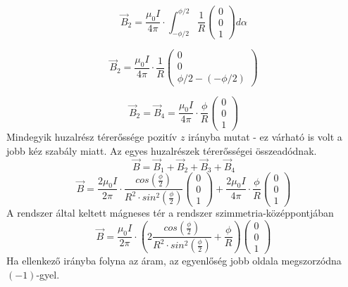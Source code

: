 \documentclass[11pt,a4paper,openany,leqno]{article}
\begin{document}
$$ \vec{B}_2 = \frac{\mu_0 I}{4\pi} \cdot \int_{-\phi/2}^{\phi/2} \frac{1}{R}\begin{pmatrix} 0 \\ 0 \\ 1 \end{pmatrix} d\alpha $$

$$ \vec{B}_2 = \frac{\mu_0 I}{4\pi} \cdot \frac{1}{R}\begin{pmatrix} 0 \\ 0 \\ \phi/2 - (-\phi/2) \end{pmatrix} $$

$$ \vec{B}_2 = \vec{B}_4 = \frac{\mu_0 I}{4\pi} \cdot \frac{\phi}{R}\begin{pmatrix} 0 \\ 0 \\ 1 \end{pmatrix} $$
\indent
Mindegyik huzalrész térerőssége pozitív $z$ irányba mutat - ez várható is volt a jobb kéz szabály miatt. Az egyes huzalrészek térerősségei összeadódnak.
$$ \vec{B} = \vec{B}_1 + \vec{B}_2 + \vec{B}_3 + \vec{B}_4 $$
$$ \vec{B} = \frac{2\mu_0 I}{2\pi} \cdot \frac{cos(\frac{\phi}{2})}{R^2 \cdot sin^2(\frac{\phi}{2})} \begin{pmatrix} 0 \\ 0 \\ 1 \end{pmatrix} + \frac{2\mu_0 I}{4\pi} \cdot \frac{\phi}{R}\begin{pmatrix} 0 \\ 0 \\ 1 \end{pmatrix} $$
\indent A rendszer által keltett mágneses tér a rendszer szimmetria-középpontjában
$$ \vec{B} = \frac{\mu_0 I}{2\pi} \cdot (2\frac{cos(\frac{\phi}{2})}{R^2 \cdot sin^2(\frac{\phi}{2})} + \frac{\phi}{R})\begin{pmatrix} 0 \\ 0 \\ 1 \end{pmatrix} $$
\indent
Ha ellenkező irányba folyna az áram, az egyenlőség jobb oldala megszorzódna $(-1)$-gyel.
\end{document}

